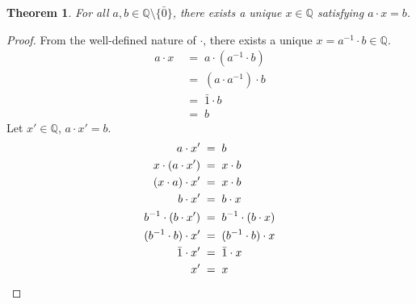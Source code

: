 \documentclass[10pt]{article}
\newtheorem{theorem}{Theorem}[section]
\theoremstyle{definition}
\theoremstyle{remark}
\newcommand{\Q}{\mathbb{Q}}
\begin{document}
        \begin{theorem}
                        For all $a, b \in \Q\setminus\{\bar{0}\}$, there exists a unique $x \in \Q$ satisfying $a \cdot x = b$.
        \end{theorem}
        \begin{proof}
                From the well-defined nature of $\cdot$, there exists a unique $x = a^{-1}\cdot b \in \Q$.
                \begin{align*}
                        a \cdot x \;&=\; a \cdot (a^{-1} \cdot b) \\
                                \;&=\; (a\cdot a^{-1}) \cdot b \\
                                \;&=\; \bar{1}\cdot b \\
                                \;&=\; b
                \end{align*}
                Let $x' \in \Q$, $a \cdot x' = b$.
                \begin{align*}
                        a\cdot x' \;&=\; b \\
                        x \cdot (a\cdot x') \;&=\; x\cdot b \\
                        (x\cdot a)\cdot x' \;&=\; x\cdot b \\
                        b\cdot x' \;&=\; b\cdot x \\
                        b^{-1}\cdot (b\cdot x') \;&=\; b^{-1}\cdot (b\cdot x) \\
                        (b^{-1}\cdot b)\cdot x' \;&=\; (b^{-1}\cdot b)\cdot x\\
                        \bar{1}\cdot x' \;&=\; \bar{1}\cdot x\\
                        x' \;&=\; x \qedhere
                \end{align*}
        \end{proof}
\end{document}
